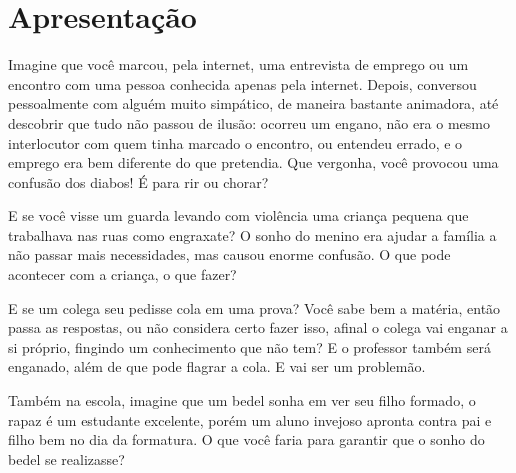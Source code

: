 
\chapter{Apresentação}
 
Imagine que você marcou, pela internet, uma entrevista de emprego ou um
encontro com uma pessoa conhecida apenas pela internet. Depois,
conversou pessoalmente com alguém muito simpático, de maneira bastante
animadora, até descobrir que tudo não passou de ilusão: ocorreu um
engano, não era o mesmo interlocutor com quem tinha marcado o encontro,
ou entendeu errado, e o emprego era bem diferente do que pretendia. Que
vergonha, você provocou uma confusão dos diabos! É para rir ou chorar?

E se você visse um guarda levando com violência uma criança pequena que
trabalhava nas ruas como engraxate? O sonho do menino era ajudar a
família a não passar mais necessidades, mas causou enorme confusão. O
que pode acontecer com a criança, o que fazer?

E se um colega seu pedisse cola em uma prova? Você sabe bem a matéria,
então passa as respostas, ou não considera certo fazer isso, afinal o
colega vai enganar a si próprio, fingindo um conhecimento que não tem? E
o professor também será enganado, além de que pode flagrar a cola. E vai
ser um problemão.

Também na escola, imagine que um bedel sonha em ver seu filho formado, o
rapaz é um estudante excelente, porém um aluno invejoso apronta contra
pai e filho bem no dia da formatura. O que você faria para garantir que
o sonho do bedel se realizasse?

